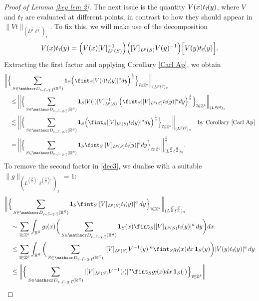 \documentclass[11pt, reqno]{amsart}
\theoremstyle{definition}
\theoremstyle{remark}
\numberwithin{equation}{section}
\newcommand{\D}{\mathscr D}
\newcommand{\R}{\mathbb R}
\newcommand{\Z}{\mathbb Z}
\newcommand{\vone}{\vec 1}
\newcommand{\vi}{\vec{\textit{\i}}}
\newcommand{\vn}{\vec n}
\newcommand{\vl}{\vec l}
\newcommand{\vp}{\vec p}
\newcommand{\vq}{\vec q}
\newcommand{\one}{\mathbf{1}}
\newcommand{\aveL}{\textit{\L}}
\newcommand{\abs}[1]{|#1|}
\newcommand{\Norm}[2]{\|#1\|_{#2}}
\newcommand{\bbNorm}[2]{\bigg\|#1\bigg\|_{#2}}
\begin{document}
\begin{proof}[Proof of Lemma \ref{key lem 2}]
The next issue is the quantity $V(x)t_{\vi}(y)$, where $V$ and $t_{\vi}$ are evaluated at different points, in contrast to how they should appear in $\Norm{Vt}{(L^{\vp}\ell^{\vq})_\pi}$. To fix this, we will make use of the decomposition
\begin{equation}\label{dec3}
V(x)t_{\vi}(y)
= \Big(V(x)[V]_{\aveL^p(S)}^{-1}\Big) \Big( [V]_{\aveL^p(S)} V(y)^{-1}\Big) \Big[ V(y)t_{\vi}(y) \Big].
\end{equation}
Extracting the first factor and applying Corollary \ref{Carl Ap}, we obtain
\begin{align*}
& \bbNorm{\Big\{ \sum_{S\in\D_{\vi-\vl-2\cdot\vone}(\R^{\vn})}\one_S
\Big(\fint_{S}\abs{V(\cdot)t_{\vi}(y)}^a dy\Big)^{\frac1a} \Big\}_{\vi\in\Z^k} }{(L^{\vp}\ell^{\vq})_\pi} \\
&\quad\leq\bbNorm{\Big\{ \sum_{S\in\D_{\vi-\vl-2\cdot\vone}(\R^{\vn})}\one_S\abs{V(\cdot)[V]_{\aveL^p(S)}^{-1}}
\Big(\fint_{S}\abs{[V]_{\aveL^p(S)}t_{\vi}(y)}^a dy\Big)^{\frac1a} \Big\}_{\vi\in\Z^k} }{(L^{\vp}\ell^{\vq})_\pi} \\
&\quad\lesssim\bbNorm{\Big\{ \sum_{S\in\D_{\vi-\vl-2\cdot\vone}(\R^{\vn})}\one_S
\Big(\fint_{S}\abs{[V]_{\aveL^p(S)}t_{\vi}(y)}^a dy\Big)^{\frac1a} \Big\}_{\vi\in\Z^k} }{(L^{\vp}\ell^{\vq})_\pi}
\quad\text{by Corollary \ref{Carl Ap}} \\
&\quad=\bbNorm{\Big\{ \sum_{S\in\D_{\vi-\vl-2\cdot\vone}(\R^{\vn})}\one_S
\fint_{S}\abs{[V]_{\aveL^p(S)}t_{\vi}(y)}^a dy\Big\}_{\vi\in\Z^k} }{(L^{\frac{\vp}{a}}\ell^{\frac{\vq}{a}})_\pi}^{\frac1a}.
\end{align*}
To remove the second factor in \eqref{dec3}, we dualise with a suitable $\Norm{g}{(L^{(\frac{\vp}{a})'}\ell^{(\frac{\vq}{a})'})_\pi}=1$:
\begin{align*}
&\bbNorm{\Big\{ \sum_{S\in\D_{\vi-\vl-2\cdot\vone}(\R^{\vn})}\one_S
\fint_{S}\abs{[V]_{\aveL^p(S)}t_{\vi}(y)}^a \,dy\Big\}_{\vi\in\Z^k} }{(L^{\frac{\vp}{a}}\ell^{\frac{\vq}{a}})_\pi} \\
&\quad\sim\sum_{\vi\in\Z^k}\int_{\R^{\vn}}g_{\vi}(x)\bigg(\sum_{S\in\D_{\vi-\vl-2
\cdot\vone}(\R^{\vn})}\one_S(x)
\fint_{S}\abs{[V]_{\aveL^p(S)}t_{\vi}(y)}^a \,dy\bigg)dx \\
&\quad\leq\sum_{\vi\in\Z^k}\int_{\R^{\vn}}\bigg(\sum_{S\in\D_{\vi-\vl-2\cdot\vone}(\R^{\vn})} \abs{[V]_{\aveL^p(S)}V^{-1}(y)}^a\fint_S g_{\vi}(x)dx\, \one_S(y)\bigg)     \abs{V(y)t_{\vi}(y)}^a \,dy \\
&\quad\leq\bbNorm{\Big\{
\sum_{S\in\D_{\vi-\vl-2\cdot\vone}(\R^{\vn})} \abs{[V]_{\aveL^p(S)}V^{-1}(\cdot)}^a\fint_S g_{\vi}(x)dx\, \one_S(\cdot)\Big\}_{\vi\in\Z^k}}{
}
\end{align*}
\end{proof}
\end{document}

